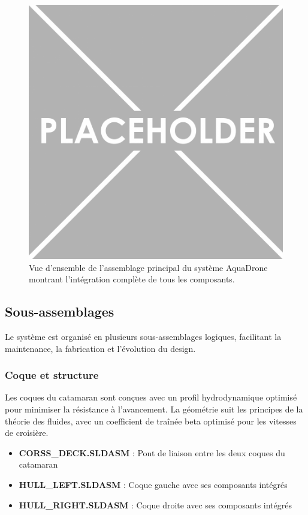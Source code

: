 {\begin{figure}[!htpb]
    \centering
    \includegraphics[width=0.8\linewidth]{Figures/PezizaTuberosa.jpg}
    \caption[Vue d'ensemble de l'assemblage principal]{Vue d'ensemble de l'assemblage principal du système AquaDrone montrant l'intégration complète de tous les composants.}
    \label{fig:assemblage-principal}
\end{figure}

\subsection{Sous-assemblages}
Le système est organisé en plusieurs sous-assemblages logiques, facilitant la maintenance, la fabrication et l'évolution du design.

\subsubsection{Coque et structure}
Les coques du catamaran sont conçues avec un profil hydrodynamique optimisé pour minimiser la résistance à l'avancement. La géométrie suit les principes de la théorie des fluides, avec un coefficient de traînée \gls{beta} optimisé pour les vitesses de croisière.

\begin{itemize}
    \setlength{\itemsep}{.375em}
    \item \textbf{CORSS\_DECK.SLDASM} : Pont de liaison entre les deux coques du catamaran
    \item \textbf{HULL\_LEFT.SLDASM} : Coque gauche avec ses composants intégrés
    \item \textbf{HULL\_RIGHT.SLDASM} : Coque droite avec ses composants intégrés
\end{itemize}

}
